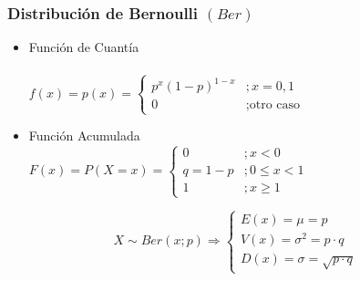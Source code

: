 \documentclass[10pt,letterpaper]{article}
\begin{document}
\subsubsection{Distribución de Bernoulli $(Ber)$}
\begin{multicols}{2}
\begin{itemize}
\item Función de Cuantía \\ \vspace{0.025cm} \\
$f(x)=p(x)=
\begin{cases}
p^x(1-p)^{1-x} &; x=0,1 \\
0 &; \text{otro caso}
\end{cases}$
\end{itemize}
\columnbreak
\begin{itemize}
\item Función Acumulada \\
$F(x)=P(X=x)=
\begin{cases}
0 &; x<0 \\
q=1-p &; 0 \leq x <1 \\
1 &; x\geq 1
\end{cases}$
\end{itemize}
\end{multicols}
$$
X\sim Ber(x;p)\Rightarrow 
\begin{cases}
E(x)=\mu = p \\
V(x)=\sigma^2 = p\cdot q \\
D(x)=\sigma=\sqrt{p\cdot q}
\end{cases}
$$
\end{document}
